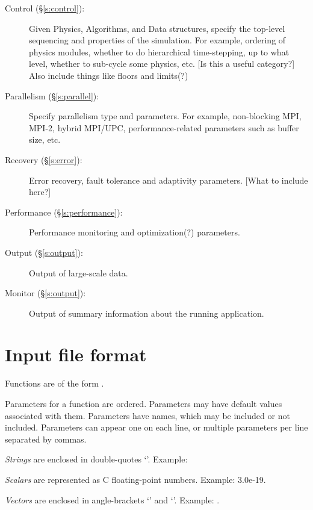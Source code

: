\documentclass{book}
\begin{document}
\begin{description}
 \item [Control (\S\ref{s:control}): ] Given Physics,
 Algorithms, and Data structures, specify the top-level sequencing and
 properties of the simulation.  For example, ordering of physics
 modules, whether to do hierarchical time-stepping, up to what level,
 whether to sub-cycle some physics, etc. [Is this a useful category?]
 Also include things like floors and limits(?)

 \item [Parallelism (\S\ref{s:parallel}): ] Specify parallelism type
 and parameters.  For example, non-blocking MPI, MPI-2, hybrid
 MPI/UPC, performance-related parameters such as buffer size, etc.

 \item [Recovery (\S\ref{s:error}): ] Error recovery, fault tolerance
 and adaptivity parameters.  [What to include here?]

 \item [Performance (\S\ref{s:performance}): ] Performance monitoring
 and optimization(?) parameters.

 \item [Output (\S\ref{s:output}): ] Output of large-scale data.

 \item [Monitor (\S\ref{s:output}): ] Output of summary information
 about the running application.
  

\end{description}

\section{Input file format}

Functions are of the form .

Parameters for a function are ordered.  Parameters may have default
values associated with them.  Parameters have names, which may be
included or not included.  Parameters can appear one on each line, or
multiple parameters per line separated by commas.

\textit{Strings} are enclosed in double-quotes `'.  Example: 

\textit{Scalars} are represented as C floating-point numbers.  Example: 3.0e-19.

\textit{Vectors} are enclosed in angle-brackets `\code{$<$}' and `\code{$>$}'.  Example: .
\end{document}
